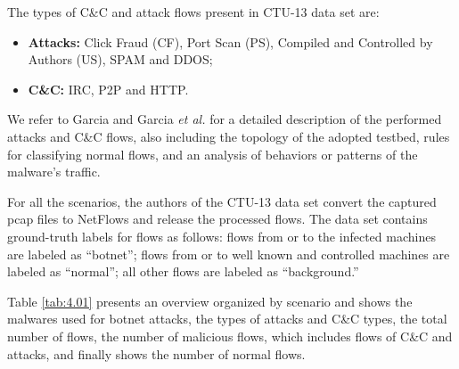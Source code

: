 The types of C\&C and attack flows present in CTU-13 data set are:

\begin{itemize}
	\item \textbf{Attacks:} Click Fraud (CF), Port Scan (PS), Compiled and Controlled by Authors (US), SPAM and DDOS;
	\item \textbf{C\&C:} IRC, P2P and HTTP.
\end{itemize}

We refer to Garcia \cite{garcia2014identifying} and Garcia \emph{et al.} \cite{garcia2014empirical} for a detailed description of the performed attacks and C\&C flows, also including the topology of the adopted testbed, rules for classifying normal flows, and an analysis of behaviors or patterns of the malware's traffic.

For all the scenarios, the authors of the CTU-13 data set convert the captured pcap files to NetFlows and release the processed flows. The data set contains ground-truth labels for flows as follows: flows from or to the infected machines are labeled as “botnet”; flows from or to well known and controlled machines are labeled as “normal”; all other flows are labeled as “background.”

Table \ref{tab:4.01} presents an overview organized by scenario and shows the malwares used for botnet attacks, the types of attacks and C\&C types, the total number of flows, the number of malicious flows, which includes flows of C\&C and attacks, and finally shows the number of normal flows.

